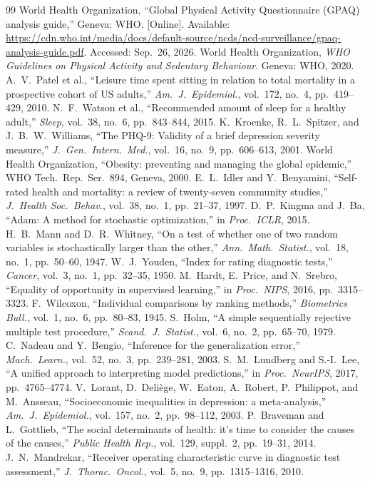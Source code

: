 \documentclass[conference]{IEEEtran}
\begin{document}
\begin{thebibliography}{99}
 World Health Organization, ``Global Physical Activity Questionnaire (GPAQ) analysis guide,'' Geneva: WHO. [Online]. Available: \url{https://cdn.who.int/media/docs/default-source/ncds/ncd-surveillance/gpaq-analysis-guide.pdf}. Accessed: Sep.~26, 2026.
 World Health Organization, \emph{WHO Guidelines on Physical Activity and Sedentary Behaviour}. Geneva: WHO, 2020.
 A.~V.~Patel et al., ``Leisure time spent sitting in relation to total mortality in a prospective cohort of US adults,'' \emph{Am.\ J.\ Epidemiol.}, vol.~172, no.~4, pp.~419--429, 2010.
 N.~F.~Watson et al., ``Recommended amount of sleep for a healthy adult,'' \emph{Sleep}, vol.~38, no.~6, pp.~843--844, 2015.
 K.~Kroenke, R.~L.~Spitzer, and J.~B.~W.~Williams, ``The PHQ-9: Validity of a brief depression severity measure,'' \emph{J.\ Gen.\ Intern.\ Med.}, vol.~16, no.~9, pp.~606--613, 2001.
 World Health Organization, ``Obesity: preventing and managing the global epidemic,'' WHO Tech.\ Rep.\ Ser.\ 894, Geneva, 2000.
 E.~L.~Idler and Y.~Benyamini, ``Self-rated health and mortality: a review of twenty-seven community studies,'' \emph{J.\ Health Soc.\ Behav.}, vol.~38, no.~1, pp.~21--37, 1997.
 D.~P.~Kingma and J.~Ba, ``Adam: A method for stochastic optimization,'' in \emph{Proc.\ ICLR}, 2015.
 H.~B.~Mann and D.~R.~Whitney, ``On a test of whether one of two random variables is stochastically larger than the other,'' \emph{Ann.\ Math.\ Statist.}, vol.~18, no.~1, pp.~50--60, 1947.
 W.~J.~Youden, ``Index for rating diagnostic tests,'' \emph{Cancer}, vol.~3, no.~1, pp.~32--35, 1950.
 M.~Hardt, E.~Price, and N.~Srebro, ``Equality of opportunity in supervised learning,'' in \emph{Proc.\ NIPS}, 2016, pp.~3315--3323.
 F.~Wilcoxon, ``Individual comparisons by ranking methods,'' \emph{Biometrics Bull.}, vol.~1, no.~6, pp.~80--83, 1945.
 S.~Holm, ``A simple sequentially rejective multiple test procedure,'' \emph{Scand.\ J.\ Statist.}, vol.~6, no.~2, pp.~65--70, 1979.
 C.~Nadeau and Y.~Bengio, ``Inference for the generalization error,'' \emph{Mach.\ Learn.}, vol.~52, no.~3, pp.~239--281, 2003.
 S.~M.~Lundberg and S.-I.~Lee, ``A unified approach to interpreting model predictions,'' in \emph{Proc.\ NeurIPS}, 2017, pp.~4765--4774.
 V.~Lorant, D.~Deli\`ege, W.~Eaton, A.~Robert, P.~Philippot, and M.~Ansseau, ``Socioeconomic inequalities in depression: a meta-analysis,'' \emph{Am.\ J.\ Epidemiol.}, vol.~157, no.~2, pp.~98--112, 2003.
 P.~Braveman and L.~Gottlieb, ``The social determinants of health: it's time to consider the causes of the causes,'' \emph{Public Health Rep.}, vol.~129, suppl.~2, pp.~19--31, 2014.
 J.~N.~Mandrekar, ``Receiver operating characteristic curve in diagnostic test assessment,'' \emph{J.\ Thorac.\ Oncol.}, vol.~5, no.~9, pp.~1315--1316, 2010.
\end{thebibliography}
\end{document}
